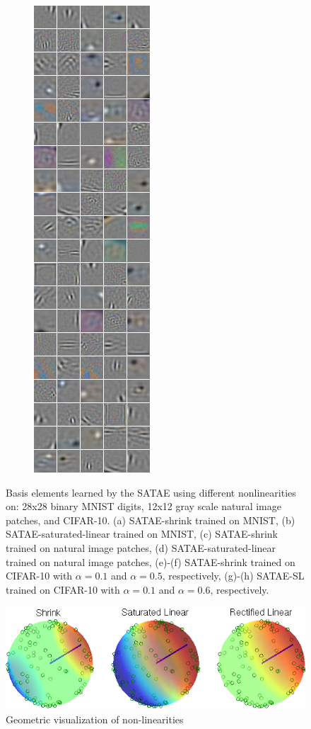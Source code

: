 {\begin{figure}
\begin{subfigure}[b]{0.2\textwidth}
\includegraphics[width=\x, height=\y]{./figures/SATAE/CIFAR_sat_linear300_6.png}
\caption{} \end{subfigure} \caption{\small Basis elements learned by the SATAE using
different nonlinearities on: 28x28 binary MNIST digits, 12x12 gray scale
natural image patches, and CIFAR-10. (a) SATAE-shrink trained on MNIST, (b)
SATAE-saturated-linear trained on MNIST, (c) SATAE-shrink trained on natural
image patches, (d) SATAE-saturated-linear trained on natural image patches,
(e)-(f) SATAE-shrink trained on CIFAR-10 with $\alpha=0.1$ and $\alpha=0.5$,
respectively, (g)-(h) SATAE-SL trained on CIFAR-10 with $\alpha=0.1$ and
$\alpha=0.6$, respectively.  } \label{fig:results} \end{figure}
\clearpage} 

\begin{figure} \centering \includegraphics[scale=0.5]{./figures/SATAE/viz_nonlin.png}
\caption{Geometric visualization of non-linearities}
\end{figure} 


